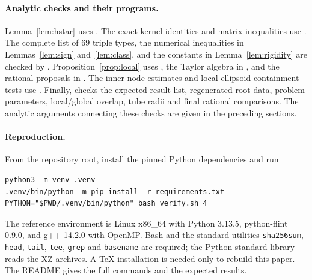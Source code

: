 \documentclass[11pt]{article}
\theoremstyle{definition}
\begin{document}
\paragraph{Analytic checks and their programs.}
Lemma~\ref{lem:hstar} uses .
The exact kernel identities and matrix inequalities use .
The complete list of $69$ triple types, the numerical inequalities in Lemmas~\ref{lem:sign} and~\ref{lem:class},
and the constants in Lemma~\ref{lem:rigidity} are checked by .
Proposition~\ref{prop:local} uses , the Taylor algebra in ,
and the rational proposals in .
The inner-node estimates and local ellipsoid containment tests use .
Finally,  checks the expected result list, regenerated root data, problem parameters,
local/global overlap, tube radii and final rational comparisons. The analytic arguments connecting these
checks are given in the preceding sections.

\paragraph{Reproduction.}
From the repository root, install the pinned Python dependencies and run
\begin{verbatim}
python3 -m venv .venv
.venv/bin/python -m pip install -r requirements.txt
PYTHON="$PWD/.venv/bin/python" bash verify.sh 4
\end{verbatim}
The reference environment is Linux x86\_64 with Python 3.13.5, python-flint 0.9.0,
and g++ 14.2.0 with OpenMP. Bash and the standard utilities \texttt{sha256sum}, \texttt{head},
\texttt{tail}, \texttt{tee}, \texttt{grep} and \texttt{basename} are required; the Python standard
library reads the XZ archives. A TeX installation is needed only to rebuild this paper.
The README gives the full commands and the expected results.
\end{document}
